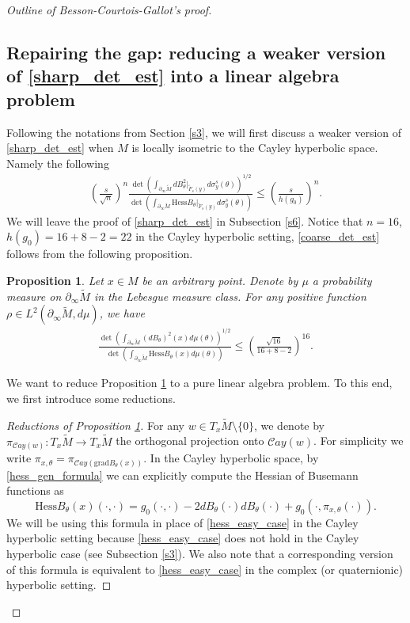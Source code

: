 \documentclass{article}
\newcommand{\del}{\partial}
\newcommand{\grad}{\mathrm{grad}}
\newcommand{\hess}{\mathrm{Hess}}
\newcommand{\Cay}{\mathcal{C}ay}
\newtheorem{prop}[thm]{Proposition}
\theoremstyle{definition}
\begin{document}
\begin{proof}[Outline of Besson-Courtois-Gallot's proof]
\subsection{Repairing the gap: reducing a weaker version of \eqref{sharp_det_est} into a linear algebra problem}\label{s4}
Following the notations from Section \ref{s3}, we will first discuss a weaker version of \eqref{sharp_det_est} when $M$ is locally isometric to the Cayley hyperbolic space. Namely the following
\begin{align}\label{coarse_det_est}
\left(\frac{s}{\sqrt{n}}\right)^n\frac{\det\left(\int_{\del_\infty\widetilde M}dB^2_\theta|_{\widetilde F_s(y)}d\sigma_y^s(\theta)\right)^{1/2}}{\det\left(\int_{\del_\infty\widetilde M}\hess B_\theta|_{\widetilde F_s(y)}d\sigma_y^s(\theta)\right)}\leq\left(\frac{s}{h(g_0)}\right)^n.
\end{align}
We will leave the proof of \eqref{sharp_det_est} in Subsection \ref{s6}. Notice that $n=16$, $h(g_0)=16+8-2=22$ in the Cayley hyperbolic setting, \eqref{coarse_det_est} follows from the following proposition.
\begin{prop}\label{ineq_prop}
Let $x\in M$ be an arbitrary point. Denote by $\mu$ a probability measure on $\del_\infty \widetilde M$ in the Lebesgue measure class. For any positive function $\rho\in L^2(\del_\infty \widetilde M,d\mu)$, we have
\begin{align}\label{VIP_ineq}\frac{\det\left(\int_{\del_\infty \widetilde M}(dB_\theta)^2(x)d\mu(\theta)\right)^{1/2}}{\det\left(\int_{\del_\infty \widetilde M}\hess B_\theta(x)d\mu(\theta)\right)}\leq\left(\frac{\sqrt{16}}{16+8-2}\right)^{16}.\end{align}
\end{prop}
We want to reduce Proposition \ref{ineq_prop} to a pure linear algebra problem. To this end, we first introduce some reductions.
\begin{proof}[Reductions of Proposition \ref{ineq_prop}]
For any $w\in T_x\widetilde M\setminus\{0\}$, we denote by $\pi_{\Cay(w)}:T_x\widetilde M\to T_x\widetilde M$ the orthogonal projection onto $\Cay(w)$. For simplicity we write $\pi_{x,\theta}=\pi_{\Cay(\grad B_\theta(x))}$. In the Cayley hyperbolic space, by \eqref{hess_gen_formula} we can explicitly compute the Hessian of Busemann functions as
$$\hess B_\theta(x)(\cdot,\cdot)=g_0(\cdot,\cdot)-2dB_\theta(\cdot)dB_\theta(\cdot)+g_0(\cdot,\pi_{x,\theta}(\cdot)).$$
We will be using this formula in place of \eqref{hess_easy_case} in the Cayley hyperbolic setting because \eqref{hess_easy_case} does not hold in the Cayley hyperbolic case (see Subsection \ref{s3}). We also note that a corresponding version of this formula is equivalent to \eqref{hess_easy_case} in the complex (or quaternionic) hyperbolic setting. 


\end{proof}
\end{proof}
\end{document}
